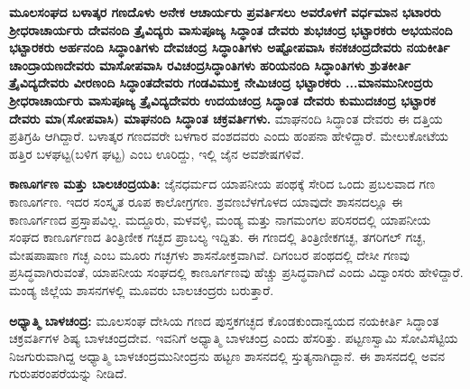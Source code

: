 \vskip 3pt

\textbf{ಮೂಲಸಂಘದ ಬಳಾತ್ಕರ ಗಣದೊಳು ಅನೇಕ ಆಚಾರ್ಯರು ಪ್ರವರ್ತಿಸಲು ಅವರೊಳಗೆ \general{\enginline{-}} ವರ್ಧಮಾನ ಭಟಾರರು \general{\enginline{-}} ಶ‍್ರೀಧರಾಚಾರ್ಯರು \general{\enginline{-}} ದೇವನಂದಿ ತ್ರೈವಿದ್ಯರು \general{\enginline{-}} ವಾಸುಪೂಜ್ಯ ಸಿದ್ಧಾಂತ ದೇವರು \general{\enginline{-}} ಶುಭಚಂದ್ರ ಭಟ್ಟಾರಕರು \general{\enginline{-}} ಅಭಯನಂದಿ ಭಟ್ಟಾರಕರು \general{\enginline{-}} ಅರ್ಹನಂದಿ ಸಿದ್ಧಾಂತಿಗಳು \general{\enginline{-}} ದೇವಚಂದ್ರ ಸಿದ್ಧಾಂತಿಗಳು \general{\enginline{-}} ಅಷ್ಟೋಪವಾಸಿ ಕನಕಚಂದ್ರದೇವರು \general{\enginline{-}} ನಯಕೀರ್ತಿ\general{\break } ಚಾಂದ್ರಾಯಣದೇವರು \general{\enginline{-}} ಮಾಸೋಪವಾಸಿ ರವಿಚಂದ್ರಸಿದ್ಧಾಂತಿಗಳು \general{\enginline{-}} ಹರಿಯನಂದಿ ಸಿದ್ಧಾಂತಿಗಳು \general{\enginline{-}}\general{\break }ಶ್ರುತಕೀರ್ತಿ ತ್ರೈವಿದ್ಯದೇವರು \general{\enginline{-}} ವೀರಣಂದಿ ಸಿದ್ಧಾಂತದೇವರು \general{\enginline{-}} ಗಂಡವಿಮುಕ್ತ ನೇಮಿಚಂದ್ರ ಭಟ್ಟಾರಕರು \general{\enginline{-}}\general{\break }...ಮಾನಮುನೀಂದ್ರರು \general{\enginline{-}} ಶ‍್ರೀಧರಾಚಾರ್ಯರು \general{\enginline{-}} ವಾಸುಪೂಜ್ಯ ತ್ರೈವಿದ್ಯದೇವರು \general{\enginline{-}} ಉದಯಚಂದ್ರ ಸಿದ್ಧಾಂತ\general{\break } ದೇವರು \general{\enginline{-}} ಕುಮುದಚಂದ್ರ ಭಟ್ಟಾರಕ ದೇವರು \general{\enginline{-}} ಮಾ(ಸೋಪವಾಸಿ) ಮಾಘನಂದಿ ಸಿದ್ಧಾಂತ ಚಕ್ರವರ್ತಿಗಳು. }ಮಾಘನಂದಿ ಸಿದ್ಧಾಂತ ದೇವರು ಈ ದತ್ತಿಯ ಪ್ರತಿಗ್ರಹಿ ಆಗಿದ್ದಾರೆ. ಬಳಾತ್ಕರ ಗಣದವರೇ ಬಳಗಾರ ವಂಶದವರು ಎಂದು ಹಂಪನಾ ಹೇಳಿದ್ದಾರೆ. ಮೇಲುಕೋಟೆಯ ಹತ್ತಿರ ಬಳಘಟ್ಟ(ಬಳಿಗ ಘಟ್ಟ) ಎಂಬ ಊರಿದ್ದು, ಇಲ್ಲಿ ಜೈನ ಅವಶೇಷಗಳಿವೆ.

\vskip 3pt

\textbf{ಕಾಣೂರ್ಗಣ ಮತ್ತು ಬಾಲಚಂದ್ರಯತಿ:} ಜೈನಧರ್ಮದ ಯಾಪನೀಯ ಪಂಥಕ್ಕೆ ಸೇರಿದ ಒಂದು ಪ್ರಬಲವಾದ ಗಣ ಕಾಣೂರ್ಗಣ. ಇದರ ಸಂಸ್ಕೃತ ರೂಪ ಕಾಲೋಗ್ರಗಣ. ಶ್ರವಣಬೆಳಗೊಳದ ಯಾವುದೇ ಶಾಸನದಲ್ಲೂ ಈ ಕಾಣೂರ್ಗಣದ ಪ್ರಸ್ತಾಪವಿಲ್ಲ. ಮದ್ದೂರು, ಮಳವಳ್ಳಿ, ಮಂಡ್ಯ ಮತ್ತು ನಾಗಮಂಗಲ ಪರಿಸರದಲ್ಲಿ ಯಾಪನೀಯ ಸಂಘದ ಕಾಣೂರ್ಗಣದ ತಿಂತ್ರಿಣೀಕ ಗಚ್ಛದ ಪ್ರಾಬಲ್ಯ ಇದ್ದಿತು. ಈ ಗಣದಲ್ಲಿ ತಿಂತ್ರಿಣೀಕಗಚ್ಛ, ತಗರಿಗಲ್​ ಗಚ್ಛ, ಮೇಷಪಾಷಾಣ ಗಚ್ಛ ಎಂಬ ಮೂರು ಗಚ್ಛಗಳು ಶಾಸನೋಕ್ತವಾಗಿವೆ. ದಿಗಂಬರ ಪಂಥದಲ್ಲಿ ದೇಸೀ ಗಣವು ಪ್ರಸಿದ್ಧವಾಗಿರುವಂತೆ, ಯಾಪನೀಯ ಸಂಘದಲ್ಲಿ ಕಾಣೂರ್ಗಣವು ಹೆಚ್ಚು ಪ್ರಸಿದ್ಧವಾಗಿದೆ ಎಂದು ವಿದ್ವಾಂಸರು ಹೇಳಿದ್ದಾರೆ. ಮಂಡ್ಯ ಜಿಲ್ಲೆಯ ಶಾಸನಗಳಲ್ಲಿ ಮೂವರು ಬಾಲಚಂದ್ರರು ಬರುತ್ತಾರೆ.

\textbf{ಅಧ್ಯಾತ್ಮಿ ಬಾಳಚಂದ್ರ:} ಮೂಲಸಂಘ ದೇಸಿಯ ಗಣದ ಪುಸ್ತಕಗಚ್ಛದ ಕೊಂಡಕುಂದಾನ್ವಯದ ನಯಕೀರ್ತಿ ಸಿದ್ಧಾಂತ ಚಕ್ರವರ್ತಿಗಳ ಶಿಷ್ಯ ಬಾಳಚಂದ್ರದೇವ. ಇವನಿಗೆ ಅಧ್ಯಾತ್ಮಿ ಬಾಳಚಂದ್ರ ಎಂದು ಹೆಸರಿತ್ತು. ಪಟ್ಟಣಸ್ವಾಮಿ ಸೋವಿಸೆಟ್ಟಿಯ ನಿಜಗುರುವಾಗಿದ್ದ ಅಧ್ಯಾತ್ಮಿ ಬಾಳಚಂದ್ರಮುನೀಂದ್ರನು ಹಟ್ಟಣ ಶಾಸನದಲ್ಲಿ ಸ್ತುತ್ಯನಾಗಿದ್ದಾನೆ. ಈ ಶಾಸನದಲ್ಲಿ ಅವನ ಗುರುಪರಂಪರೆಯನ್ನು ನೀಡಿದೆ.

